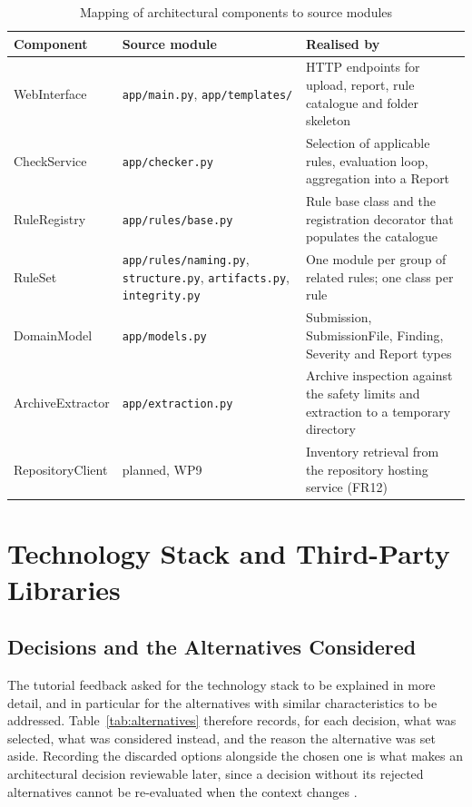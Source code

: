 \documentclass[a4paper,11pt]{article}
\begin{document}
\begin{table}[H]
\centering
\caption{Mapping of architectural components to source modules}
\label{tab:mapping}
\footnotesize
\renewcommand{\arraystretch}{1.2}
\setlength{\tabcolsep}{4pt}
\begin{tabularx}{\textwidth}{|p{3.2cm}|p{4.2cm}|X|}
\hline
\rowcolor{gray!15}
\textbf{Component} & \textbf{Source module} & \textbf{Realised by} \\
\hline
\hline
WebInterface      & \texttt{app/main.py}, \texttt{app/templates/} & HTTP endpoints for upload, report, rule catalogue and folder skeleton \\
\hline
CheckService      & \texttt{app/checker.py}        & Selection of applicable rules, evaluation loop, aggregation into a Report \\
\hline
RuleRegistry      & \texttt{app/rules/base.py}     & Rule base class and the registration decorator that populates the catalogue \\
\hline
RuleSet           & \texttt{app/rules/naming.py}, \texttt{structure.py}, \texttt{artifacts.py}, \texttt{integrity.py} & One module per group of related rules; one class per rule \\
\hline
DomainModel       & \texttt{app/models.py}         & Submission, SubmissionFile, Finding, Severity and Report types \\
\hline
ArchiveExtractor  & \texttt{app/extraction.py}     & Archive inspection against the safety limits and extraction to a temporary directory \\
\hline
RepositoryClient  & planned, WP9                   & Inventory retrieval from the repository hosting service (FR12) \\
\hline
\end{tabularx}
\end{table}

\section{Technology Stack and Third-Party Libraries}\label{sec:stack}

\subsection{Decisions and the Alternatives Considered}\label{subsec:alternatives}

The tutorial feedback asked for the technology stack to be explained in more
detail, and in particular for the alternatives with similar characteristics to
be addressed. Table~\ref{tab:alternatives} therefore records, for each decision,
what was selected, what was considered instead, and the reason the alternative
was set aside. Recording the discarded options alongside the chosen one is what
makes an architectural decision reviewable later, since a decision without its
rejected alternatives cannot be re-evaluated when the context changes
\citep{Ford2021}.
\end{document}
